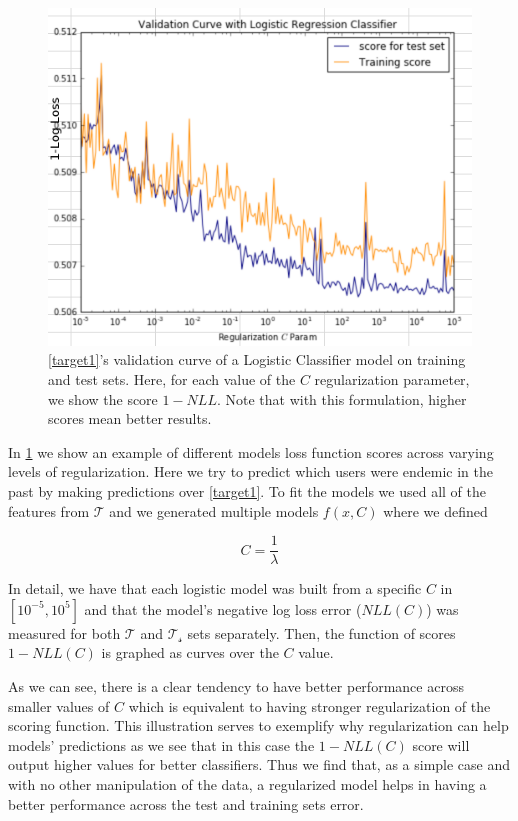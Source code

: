 \begin{figure}[h!]
\begin{center}
\includegraphics[width=0.9\columnwidth]{figures/regularization/figure-log_loss_error_validation_curve}
\caption{ \cref{target1}'s validation curve of a Logistic Classifier model on training and test sets. Here, for each value of the $C$ regularization parameter, we show the score $1 - NLL$. Note that with this formulation, higher scores mean better results.}
\label{fig:log_loss_regularization_validation_curve}
\end{center}
\end{figure}

In \cref{fig:log_loss_regularization_validation_curve} we show an example of different models loss function scores across varying levels of regularization.
Here we try to predict which users were endemic in the past by making predictions over \cref{target1}.
To fit the models we used all of the features from $\mathcal{T}$ and we generated multiple models $f(x,C)$ where we defined

$$C = \frac{1}{\lambda} $$

In detail, we have that each logistic model was built from a specific $C$ in  $[10^{-5},10^5]$ and that the model's negative log loss error ($NLL(C)$) was measured for both $\mathcal{T}$ and $\mathcal{T_s}$ sets separately.
Then, the function of scores $1-NLL(C)$ is graphed as curves over the $C$ value.

As we can see, there is a clear tendency to have better performance across smaller values of $C$ which is equivalent to having stronger regularization of the scoring function.
This illustration serves to exemplify why regularization can help models' predictions as we see that in this case the $1-NLL(C)$ score will output higher values for better classifiers.
Thus we find that, as a simple case and with no other manipulation of the data, a regularized model helps in having a better performance across the test and training sets error.


